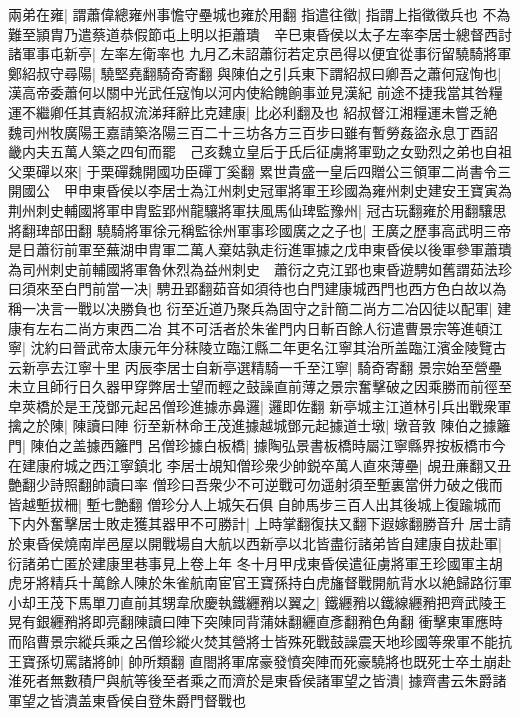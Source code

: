 兩弟在雍|{
	謂蕭偉總雍州事憺守壘城也雍於用翻}
指遣往徵|{
	指謂上指徵徵兵也}
不為難至頴胄乃遣蔡道恭假節屯上明以拒蕭璝　辛巳東昏侯以太子左率李居士總督西討諸軍事屯新亭|{
	左率左衛率也}
九月乙未詔蕭衍若定京邑得以便宜從事衍留驍騎將軍鄭紹叔守尋陽|{
	驍堅堯翻騎奇寄翻}
與陳伯之引兵東下謂紹叔曰卿吾之蕭何寇恂也|{
	漢高帝委蕭何以關中光武任寇恂以河内使給餽餉事並見漢紀}
前途不捷我當其咎糧運不繼卿任其責紹叔流涕拜辭比克建康|{
	比必利翻及也}
紹叔督江湘糧運未嘗乏絶　魏司州牧廣陽王嘉請築洛陽三百二十三坊各方三百步曰雖有暫勞姦盜永息丁酉詔畿内夫五萬人築之四旬而罷　己亥魏立皇后于氏后征虜將軍勁之女勁烈之弟也自祖父栗磾以來|{
	于栗磾魏開國功臣磾丁奚翻}
累世貴盛一皇后四贈公三領軍二尚書令三開國公　甲申東昏侯以李居士為江州刺史冠軍將軍王珍國為雍州刺史建安王寶寅為荆州刺史輔國將軍申胄監郢州龍驤將軍扶風馬仙琕監豫州|{
	冠古玩翻雍於用翻驤思將翻琕部田翻}
驍騎將軍徐元稱監徐州軍事珍國廣之之子也|{
	王廣之歷事高武明三帝}
是日蕭衍前軍至蕪湖申胄軍二萬人棄姑孰走衍進軍據之戊申東昏侯以後軍參軍蕭璝為司州刺史前輔國將軍魯休烈為益州刺史　蕭衍之克江郢也東昏遊騁如舊謂茹法珍曰須來至白門前當一决|{
	騁丑郢翻茹音如須待也白門建康城西門也西方色白故以為稱一决言一戰以决勝負也}
衍至近道乃聚兵為固守之計簡二尚方二冶囚徒以配軍|{
	建康有左右二尚方東西二冶}
其不可活者於朱雀門内日斬百餘人衍遣曹景宗等進頓江寧|{
	沈約曰晉武帝太康元年分秣陵立臨江縣二年更名江寧其治所盖臨江濱金陵覽古云新亭去江寧十里}
丙辰李居士自新亭選精騎一千至江寧|{
	騎奇寄翻}
景宗始至營壘未立且師行日久器甲穿弊居士望而輕之鼓譟直前薄之景宗奮擊破之因乘勝而前徑至皁莢橋於是王茂鄧元起呂僧珍進據赤鼻邏|{
	邏即佐翻}
新亭城主江道林引兵出戰衆軍擒之於陳|{
	陳讀曰陣}
衍至新林命王茂進據越城鄧元起據道士墩|{
	墩音敦}
陳伯之據籬門|{
	陳伯之盖據西籬門}
呂僧珍據白板橋|{
	據陶弘景書板橋時屬江寧縣界按板橋市今在建康府城之西江寧鎮北}
李居士覘知僧珍衆少帥鋭卒萬人直來薄壘|{
	覘丑亷翻又丑艶翻少詩照翻帥讀曰率}
僧珍曰吾衆少不可逆戰可勿遥射須至塹裏當併力破之俄而皆越塹拔柵|{
	塹七艶翻}
僧珍分人上城矢石俱自帥馬步三百人出其後城上復踰城而下内外奮擊居士敗走獲其器甲不可勝計|{
	上時掌翻復扶又翻下遐嫁翻勝音升}
居士請於東昏侯燒南岸邑屋以開戰場自大航以西新亭以北皆盡衍諸弟皆自建康自拔赴軍|{
	衍諸弟亡匿於建康里巷事見上卷上年}
冬十月甲戌東昏侯遣征虜將軍王珍國軍主胡虎牙將精兵十萬餘人陳於朱雀航南宦官王寶孫持白虎旛督戰開航背水以絶歸路衍軍小却王茂下馬單刀直前其甥韋欣慶執鐵纒矟以翼之|{
	鐵纒矟以鐵線纒矟把齊武陵王晃有銀纒矟將即亮翻陳讀曰陣下突陳同背蒲妹翻纒直彥翻矟色角翻}
衝擊東軍應時而陷曹景宗縱兵乘之呂僧珍縱火焚其營將士皆殊死戰鼓譟震天地珍國等衆軍不能抗王寶孫切罵諸將帥|{
	帥所類翻}
直閤將軍席豪發憤突陣而死豪驍將也既死士卒土崩赴淮死者無數積尸與航等後至者乘之而濟於是東昏侯諸軍望之皆潰|{
	據齊書云朱爵諸軍望之皆潰盖東昏侯自登朱爵門督戰也}
